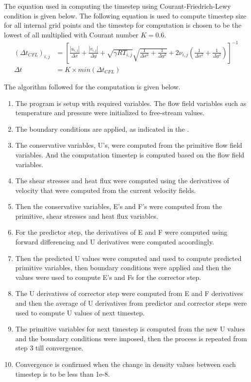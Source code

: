 \documentclass[conf]{new-aiaa}
\begin{document}
\par The equation used in computing the timestep using Courant-Friedrich-Lewy
condition is given below. The following equation is used to compute timestep
size for all internal grid points and the timestep for computation is chosen to
be the lowest of all multiplied with Courant number $K = 0.6$.
\begin{align*}
    \left(\Delta t_{CFL}\right)_{i,j} &= \left[\frac{|u_{i,j}|}{\Delta x} + \frac{|v_{i,j}|}{\Delta y}+ \sqrt{\gamma R T_{i,j}}\sqrt{\frac{1}{\Delta x^2} + \frac{1}{\Delta y^2}} + 2\nu_{i,j} \left(\frac{1}{\Delta x^2} + \frac{1}{\Delta y^2}\right)\right]^{-1} \\
    \Delta t &= K \times min\left(\Delta t_{CFL}\right)
\end{align*}

\par The algorithm followed for the computation is given below.
\begin{enumerate}
    \item The program is setup with required variables. The flow field variables
        such as temperature and pressure were initialized to free-stream values.
    \item The boundary conditions are applied, as indicated in the .
    \item The conservative variables, U's, were computed from the primitive flow
        field variables. And the computation timestep is computed based on the
        flow field variables.
    \item The shear stresses and heat flux were computed using the derivatives
        of velocity that were computed from the current velocity fields.
    \item Then the conservative variables, E's and F's were computed from the
        primitive, shear stresses and heat flux variables.
    \item For the predictor step, the derivatives of E and F were computed using
        forward differencing and U derivatives were computed acoordingly.
    \item Then the predicted U values were computed and used to compute
        predicted primitive variables, then boundary conditions were applied
        and then the values were used to compute E's and Fs for the corrector
        step.
    \item The U derivatives of corrector step were computed from E and F derivatives
        and then the average of U derivatives from predictor and corrector steps
        were used to compute U values of next timestep.
    \item The primitive variables for next timestep is computed from the new
        U values and the boundary conditions were imposed, then the process
        is repeated from step 3 till convergence.
    \item Convergence is confirmed when the change in density values between
        each timestep is to be less than 1e-8.
\end{enumerate}
\end{document}
